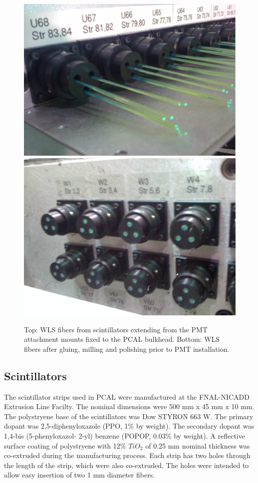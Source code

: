 \begin{figure}[hbt]
\centering
\includegraphics[width=0.9\columnwidth,keepaspectratio]{img/S3_5a.png}
\includegraphics[width=0.9\columnwidth,keepaspectratio]{img/S3_5b.png}
\caption[PCAL UVW Layers]{Top: WLS fibers from scintillators extending from the PMT attachment mounts fixed to the PCAL bulkhead. Bottom: WLS fibers after gluing, milling and polishing prior to PMT installation.}
\label{fig:S3_5}
\end{figure}

\subsection{Scintillators}

The scintillator strips used in PCAL were manufactured at the FNAL-NICADD Extrusion Line Facilty.  The nominal dimensions were 500 mm x 45 mm x 10 mm. The polystryene base of the scintillators was Dow STYRON 663 W. The primary dopant was 2,5-diphenyloxazole (PPO, 1$\%$ by weight). The secondary dopant was 1,4-bis (5-phenyloxazol- 2-yl) benzene (POPOP, 0.03$\%$ by weight).  A reflective surface coating of polystryene with 12$\%$ $TiO_2$ of 0.25 mm nominal thickness was co-extruded during the manufacturing process.  Each strip has two holes through the length of the strip, which were also co-extruded. The holes were intended to allow easy insertion of two 1 mm diameter fibers.

